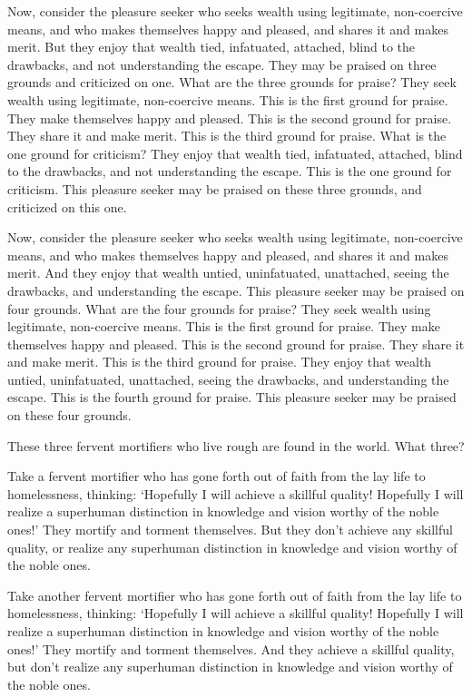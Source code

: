 \documentclass[12pt,openany]{book}%
\begin{document}
Now, consider the pleasure seeker who seeks wealth using legitimate, non-coercive means, and who makes themselves happy and pleased, and shares it and makes merit. But they enjoy that wealth tied, infatuated, attached, blind to the drawbacks, and not understanding the escape. They may be praised on three grounds and criticized on one. What are the three grounds for praise? They seek wealth using legitimate, non-coercive means. This is the first ground for praise. They make themselves happy and pleased. This is the second ground for praise. They share it and make merit. This is the third ground for praise. What is the one ground for criticism? They enjoy that wealth tied, infatuated, attached, blind to the drawbacks, and not understanding the escape. This is the one ground for criticism. This pleasure seeker may be praised on these three grounds, and criticized on this one. 

Now, consider the pleasure seeker who seeks wealth using legitimate, non-coercive means, and who makes themselves happy and pleased, and shares it and makes merit. And they enjoy that wealth untied, uninfatuated, unattached, seeing the drawbacks, and understanding the escape. This pleasure seeker may be praised on four grounds. What are the four grounds for praise? They seek wealth using legitimate, non-coercive means. This is the first ground for praise. They make themselves happy and pleased. This is the second ground for praise. They share it and make merit. This is the third ground for praise. They enjoy that wealth untied, uninfatuated, unattached, seeing the drawbacks, and understanding the escape. This is the fourth ground for praise. This pleasure seeker may be praised on these four grounds. 

These three fervent mortifiers who live rough are found in the world. What three? 

Take a fervent mortifier who has gone forth out of faith from the lay life to homelessness, thinking: ‘Hopefully I will achieve a skillful quality! Hopefully I will realize a superhuman distinction in knowledge and vision worthy of the noble ones!’ They mortify and torment themselves. But they don’t achieve any skillful quality, or realize any superhuman distinction in knowledge and vision worthy of the noble ones. 

Take another fervent mortifier who has gone forth out of faith from the lay life to homelessness, thinking: ‘Hopefully I will achieve a skillful quality! Hopefully I will realize a superhuman distinction in knowledge and vision worthy of the noble ones!’ They mortify and torment themselves. And they achieve a skillful quality, but don’t realize any superhuman distinction in knowledge and vision worthy of the noble ones. 
\end{document}
